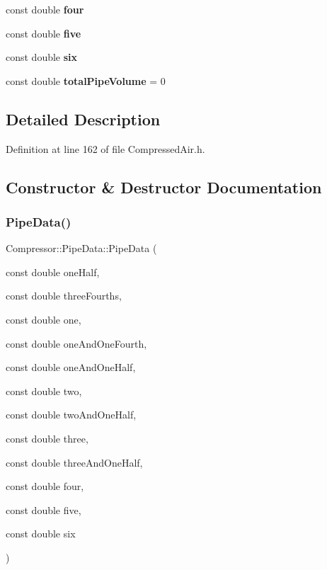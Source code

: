 \begin{DoxyCompactItemize}
const double {\bfseries four}
\item 
\mbox{\label{struct_compressor_1_1_pipe_data_aa4ca33456ade4559b80bdc55d785ca12}} 
const double {\bfseries five}
\item 
\mbox{\label{struct_compressor_1_1_pipe_data_acabd73fa371dec551937b5d9f7718317}} 
const double {\bfseries six}
\item 
\mbox{\label{struct_compressor_1_1_pipe_data_aa290d5d7f31c6b74f65b22d81b4ebf84}} 
const double {\bfseries total\+Pipe\+Volume} = 0
\end{DoxyCompactItemize}


\subsection{Detailed Description}


Definition at line 162 of file Compressed\+Air.\+h.



\subsection{Constructor \& Destructor Documentation}
\mbox{\label{struct_compressor_1_1_pipe_data_a71acdc81e25bd90b51361bf8d4f0ed38}} 
\subsubsection{\texorpdfstring{Pipe\+Data()}{PipeData()}\hspace{0.1cm}{\footnotesize\ttfamily [1/2]}}
{\footnotesize\ttfamily Compressor\+::\+Pipe\+Data\+::\+Pipe\+Data (\begin{DoxyParamCaption}\item[{const double}]{one\+Half,  }\item[{const double}]{three\+Fourths,  }\item[{const double}]{one,  }\item[{const double}]{one\+And\+One\+Fourth,  }\item[{const double}]{one\+And\+One\+Half,  }\item[{const double}]{two,  }\item[{const double}]{two\+And\+One\+Half,  }\item[{const double}]{three,  }\item[{const double}]{three\+And\+One\+Half,  }\item[{const double}]{four,  }\item[{const double}]{five,  }\item[{const double}]{six }\end{DoxyParamCaption})\hspace{0.3cm}{\ttfamily [inline]}}

